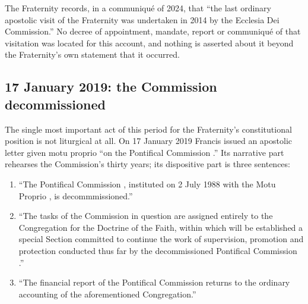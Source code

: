 The Fraternity records, in a communiqué of 2024, that ``the last ordinary
apostolic visit of the Fraternity was undertaken in 2014 by the Ecclesia
Dei Commission.'' No decree of appointment, mandate, report or communiqué
of that visitation was located for this account, and nothing is asserted
about it beyond the Fraternity's own statement that it
occurred.

\subsection{17 January 2019: the Commission decommissioned}

The single most important act of this period for the Fraternity's
constitutional position is not liturgical at all. On 17 January 2019
Francis issued an apostolic letter given motu proprio ``on the Pontifical
Commission .'' Its narrative part rehearses the
Commission's thirty years; its dispositive part is three sentences:

\begin{enumerate}
\item ``The Pontifical Commission , instituted on 2
July 1988 with the Motu Proprio , is
decommmissioned.''
\item ``The tasks of the Commission in question are assigned entirely to
the Congregation for the Doctrine of the Faith, within which will be
established a special Section committed to continue the work of
supervision, promotion and protection conducted thus far by the
decommissioned Pontifical Commission .''
\item ``The financial report of the Pontifical Commission returns to the
ordinary accounting of the aforementioned
Congregation.''
\end{enumerate}

